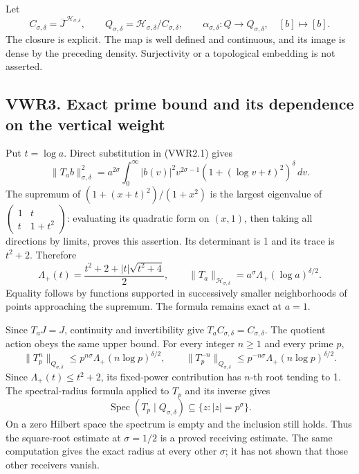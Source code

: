 Let \[
C_{\sigma,\delta}=\overline J^{\,\mathcal H_{\sigma,\delta}},\qquad
Q_{\sigma,\delta}=\mathcal H_{\sigma,\delta}/C_{\sigma,\delta},\qquad
\alpha_{\sigma,\delta}:Q\longrightarrow Q_{\sigma,\delta},\quad[b]\longmapsto[b].
\tag{VWR2.3}
\] The closure is explicit. The map is well defined and continuous, and
its image is dense by the preceding density. Surjectivity or a
topological embedding is not asserted.

\subsection{VWR3. Exact prime bound and its dependence on the vertical
weight}\label{vwr3.-exact-prime-bound-and-its-dependence-on-the-vertical-weight}

Put \(t=\log a\). Direct substitution in (VWR2.1) gives \[
\|T_ab\|_{\sigma,\delta}^2
=a^{2\sigma}\int_0^\infty |b(v)|^2v^{2\sigma-1}
 (1+(\log v+t)^2)^\delta\,dv.
\tag{VWR3.1}
\] The supremum of \((1+(x+t)^2)/(1+x^2)\) is the largest eigenvalue of
\(\begin{pmatrix}1&t\\t&1+t^2\end{pmatrix}\): evaluating its quadratic
form on \((x,1)\), then taking all directions by limits, proves this
assertion. Its determinant is 1 and its trace is \(t^2+2\). Therefore \[
\Lambda_+(t)=\frac{t^2+2+|t|\sqrt{t^2+4}}2,
\qquad
\|T_a\|_{\mathcal H_{\sigma,\delta}}=a^\sigma\Lambda_+(\log a)^{\delta/2}.
\tag{VWR3.2}
\] Equality follows by functions supported in successively smaller
neighborhoods of points approaching the supremum. The formula remains
exact at \(a=1\).

Since \(T_aJ=J\), continuity and invertibility give
\(T_aC_{\sigma,\delta}=C_{\sigma,\delta}\). The quotient action obeys
the same upper bound. For every integer \(n\ge1\) and every prime \(p\),
\[
\|T_p^n\|_{Q_{\sigma,\delta}}
\le p^{n\sigma}\Lambda_+(n\log p)^{\delta/2},\qquad
\|T_p^{-n}\|_{Q_{\sigma,\delta}}
\le p^{-n\sigma}\Lambda_+(n\log p)^{\delta/2}.
\tag{VWR3.3}
\] Since \(\Lambda_+(t)\le t^2+2\), its fixed-power contribution has
\(n\)-th root tending to 1. The spectral-radius formula applied to
\(T_p\) and its inverse gives \[
\operatorname{Spec}(T_p\mid Q_{\sigma,\delta})\subseteq\{z:|z|=p^\sigma\}.
\tag{VWR3.4}
\] On a zero Hilbert space the spectrum is empty and the inclusion still
holds. Thus the square-root estimate at \(\sigma=1/2\) is a proved
receiving estimate. The same computation gives the exact radius at every
other \(\sigma\); it has not shown that those other receivers vanish.

